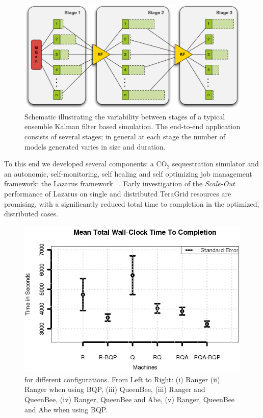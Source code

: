 \documentclass[a4paper,10pt]{article}
\begin{document}
\begin{figure}
\begin{center}
\includegraphics*[scale=0.4,angle=0]{3StageKalmanFilter}
\end{center}
\caption{Schematic illustrating the variability between stages of a typical
  ensemble Kalman filter based simulation. The end-to-end
  application consists of several stages; in general at each stage the
  number of models generated varies in size and duration.}
\label{fig:irregular_execution}
\end{figure}

To this end we developed several components: a CO$_2$ sequestration simulator and an autonomic, self-monitoring,
self healing and self optimizing job management framework: the Lazarus framework ~\cite{gmac}. Early investigation
of the {\it Scale-Out} performance of Lazarus on single and distributed TeraGrid resources are promising, with
a significantly reduced total time to completion in the optimized, distributed cases.

\begin{figure}
\begin{center}
\includegraphics[scale=0.8]{Figure7.png}
\end{center}
\caption{ for different configurations.  From Left to Right: (i)
  Ranger (ii) Ranger when using BQP, (iii) QueenBee, (iii) Ranger
  and QueenBee, (iv) Ranger, QueenBee and Abe, (v) Ranger, QueenBee 
  and Abe when using BQP.}
\label{fig:results}
\end{figure}
\end{document}
